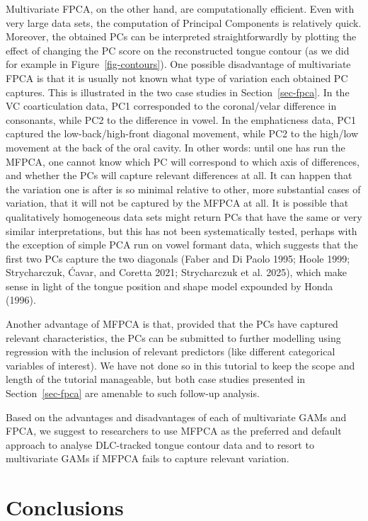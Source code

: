\documentclass[
]{interact}
\begin{document}
Multivariate FPCA, on the other hand, are computationally efficient.
Even with very large data sets, the computation of Principal Components
is relatively quick. Moreover, the obtained PCs can be interpreted
straightforwardly by plotting the effect of changing the PC score on the
reconstructed tongue contour (as we did for example in
Figure~\ref{fig-contours}). One possible disadvantage of multivariate
FPCA is that it is usually not known what type of variation each
obtained PC captures. This is illustrated in the two case studies in
Section~\ref{sec-fpca}. In the VC coarticulation data, PC1 corresponded
to the coronal/velar difference in consonants, while PC2 to the
difference in vowel. In the emphaticness data, PC1 captured the
low-back/high-front diagonal movement, while PC2 to the high/low
movement at the back of the oral cavity. In other words: until one has
run the MFPCA, one cannot know which PC will correspond to which axis of
differences, and whether the PCs will capture relevant differences at
all. It can happen that the variation one is after is so minimal
relative to other, more substantial cases of variation, that it will not
be captured by the MFPCA at all. It is possible that qualitatively
homogeneous data sets might return PCs that have the same or very
similar interpretations, but this has not been systematically tested,
perhaps with the exception of simple PCA run on vowel formant data,
which suggests that the first two PCs capture the two diagonals (Faber
and Di Paolo 1995; Hoole 1999; Strycharczuk, Ćavar, and Coretta 2021;
Strycharczuk et al. 2025), which make sense in light of the tongue
position and shape model expounded by Honda (1996).

Another advantage of MFPCA is that, provided that the PCs have captured
relevant characteristics, the PCs can be submitted to further modelling
using regression with the inclusion of relevant predictors (like
different categorical variables of interest). We have not done so in
this tutorial to keep the scope and length of the tutorial manageable,
but both case studies presented in Section~\ref{sec-fpca} are amenable
to such follow-up analysis.

Based on the advantages and disadvantages of each of multivariate GAMs
and FPCA, we suggest to researchers to use MFPCA as the preferred and
default approach to analyse DLC-tracked tongue contour data and to
resort to multivariate GAMs if MFPCA fails to capture relevant
variation.

\section{Conclusions}\label{conclusions}
\end{document}

